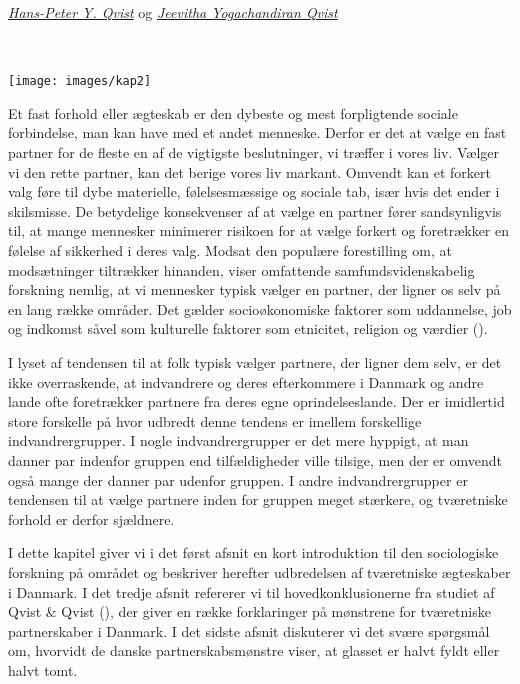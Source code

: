 \documentclass[
]{book}
\begin{document}
\emph{\href{https://vbn.aau.dk/da/persons/hpq}{Hans-Peter Y. Qvist}} og \emph{\href{https://vbn.aau.dk/da/persons/jy}{Jeevitha Yogachandiran Qvist}}

~~~~

\texttt{[image: images/kap2]}

\newpage

Et fast forhold eller ægteskab er den dybeste og mest forpligtende sociale forbindelse, man kan have med et andet menneske. Derfor er det at vælge en fast partner for de fleste en af de vigtigste beslutninger, vi træffer i vores liv. Vælger vi den rette partner, kan det berige vores liv markant. Omvendt kan et forkert valg føre til dybe materielle, følelsesmæssige og sociale tab, især hvis det ender i skilsmisse. De betydelige konsekvenser af at vælge en partner fører sandsynligvis til, at mange mennesker minimerer risikoen for at vælge forkert og foretrækker en følelse af sikkerhed i deres valg. Modsat den populære forestilling om, at modsætninger tiltrækker hinanden, viser omfattende samfundsvidenskabelig forskning nemlig, at vi mennesker typisk vælger en partner, der ligner os selv på en lang række områder. Det gælder socioøkonomiske faktorer som uddannelse, job og indkomst såvel som kulturelle faktorer som etnicitet, religion og værdier ().

I lyset af tendensen til at folk typisk vælger partnere, der ligner dem selv, er det ikke overraskende, at indvandrere og deres efterkommere i Danmark og andre lande ofte foretrækker partnere fra deres egne oprindelseslande. Der er imidlertid store forskelle på hvor udbredt denne tendens er imellem forskellige indvandrergrupper. I nogle indvandrergrupper er det mere hyppigt, at man danner par indenfor gruppen end tilfældigheder ville tilsige, men der er omvendt også mange der danner par udenfor gruppen. I andre indvandrergrupper er tendensen til at vælge partnere inden for gruppen meget stærkere, og tværetniske forhold er derfor sjældnere.

I dette kapitel giver vi i det først afsnit en kort introduktion til den sociologiske forskning på området og beskriver herefter udbredelsen af tværetniske ægteskaber i Danmark. I det tredje afsnit refererer vi til hovedkonklusionerne fra studiet af Qvist \& Qvist (), der giver en række forklaringer på mønstrene for tværetniske partnerskaber i Danmark. I det sidste afsnit diskuterer vi det svære spørgsmål om, hvorvidt de danske partnerskabsmønstre viser, at glasset er halvt fyldt eller halvt tomt.
\end{document}
